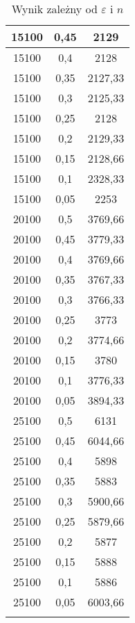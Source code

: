 \documentclass[wide,a4paper,titlepage,12pt] {article}
\begin{document}
\begin{center}
\begin{longtable}{|c|c|c|}
    15100 & 0,45 & 2129\\ \hline
    15100 & 0,4 & 2128\\ \hline
    15100 & 0,35 & 2127,33\\ \hline
    15100 & 0,3 & 2125,33\\ \hline
    15100 & 0,25 & 2128\\ \hline
    15100 & 0,2 & 2129,33\\ \hline
    15100 & 0,15 & 2128,66\\ \hline
    15100 & 0,1 & 2328,33\\ \hline
    15100 & 0,05 & 2253\\ \hline
    20100 & 0,5 & 3769,66\\ \hline
    20100 & 0,45 & 3779,33\\ \hline
    20100 & 0,4 & 3769,66\\ \hline
    20100 & 0,35 & 3767,33\\ \hline
    20100 & 0,3 & 3766,33\\ \hline
    20100 & 0,25 & 3773\\ \hline
    20100 & 0,2 & 3774,66\\ \hline
    20100 & 0,15 & 3780\\ \hline
    20100 & 0,1 & 3776,33\\ \hline
    20100 & 0,05 & 3894,33\\ \hline
    25100 & 0,5 & 6131\\ \hline
    25100 & 0,45 & 6044,66\\ \hline
    25100 & 0,4 & 5898\\ \hline
    25100 & 0,35 & 5883\\ \hline
    25100 & 0,3 & 5900,66\\ \hline
    25100 & 0,25 & 5879,66\\ \hline
    25100 & 0,2 & 5877\\ \hline
    25100 & 0,15 & 5888\\ \hline
    25100 & 0,1 & 5886\\ \hline
    25100 & 0,05 & 6003,66\\ \hline
    \caption{Wynik zależny od $\varepsilon$ i $n$}\\


  \end{longtable}
\end{center}

\newpage
{}
\end{document}
